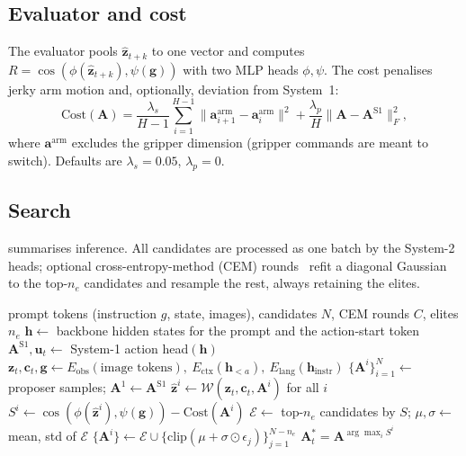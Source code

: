 \documentclass[11pt]{article}
\newcommand{\zt}{\bm{z}_t}
\newcommand{\zhat}{\hat{\bm{z}}_{t+k}}
\newcommand{\A}{\mathbf{A}}
\newcommand{\WM}{\mathcal{W}}
\begin{document}
\subsection{Evaluator and cost}
The evaluator pools $\zhat$ to one vector and computes $R = \cos(\phi(\zhat),\psi(\bm g))$ with two MLP heads $\phi,\psi$. The cost penalises jerky arm motion and, optionally, deviation from System~1:
\begin{equation}
\mathrm{Cost}(\A)=\frac{\lambda_s}{H-1}\sum_{i=1}^{H-1}\big\lVert \bm a^{\mathrm{arm}}_{i+1}-\bm a^{\mathrm{arm}}_{i}\big\rVert^2+\frac{\lambda_p}{H}\big\lVert \A-\A^{\mathrm{S1}}\big\rVert_F^2 ,
\end{equation}
where $\bm a^{\mathrm{arm}}$ excludes the gripper dimension (gripper commands are meant to switch). Defaults are $\lambda_s=0.05$, $\lambda_p=0$.

\subsection{Search}
 summarises inference. All candidates are processed as one batch by the System-2 heads; optional cross-entropy-method (CEM) rounds~\citep{rubinstein2004cem,hafner2018planet} refit a diagonal Gaussian to the top-$n_e$ candidates and resample the rest, always retaining the elites.

\begin{algorithm}[t]
\caption{LIS-VLA action selection at time $t$}
\label{alg:search}
\begin{algorithmic}[1]
\Require prompt tokens (instruction $g$, state, images), candidates $N$, CEM rounds $C$, elites $n_e$
\State $\bm h \gets$ backbone hidden states for the prompt and the action-start token 
\State $\A^{\mathrm{S1}}, \bm u_t \gets$ System-1 action head$(\bm h)$
\State $\zt, \bm c_t, \bm g \gets E_{\mathrm{obs}}(\text{image tokens}),\ E_{\mathrm{ctx}}(\bm h_{<a}),\ E_{\mathrm{lang}}(\bm h_{\mathrm{instr}})$
\State $\{\A^i\}_{i=1}^N \gets$ proposer samples; $\A^1 \gets \A^{\mathrm{S1}}$
  \State $\hat{\bm z}^i \gets \WM(\zt,\bm c_t,\A^i)$ for all $i$ 
  \State $S^i \gets \cos(\phi(\hat{\bm z}^i),\psi(\bm g)) - \mathrm{Cost}(\A^i)$
    \State $\mathcal E \gets$ top-$n_e$ candidates by $S$; $\mu,\sigma \gets$ mean, std of $\mathcal E$
    \State $\{\A^i\} \gets \mathcal E \cup \{\mathrm{clip}(\mu+\sigma\odot\epsilon_j)\}_{j=1}^{N-n_e}$
  \EndIf
\EndFor
\State \Return $\A^*_t = \A^{\arg\max_i S^i}$ 
\end{algorithmic}
\end{algorithm}
\end{document}
